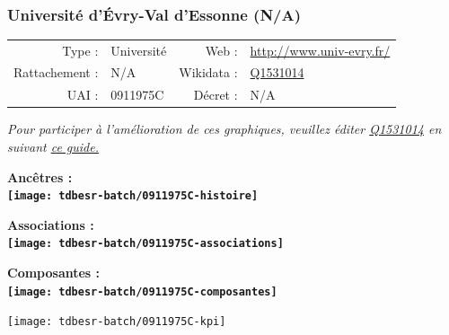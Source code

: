 \documentclass[12pt,french,]{article}
\begin{document}
\ifoddpage ~\newpage \fi   

\hypertarget{universituxe9-duxe9vry-val-dessonne-na}{%
\subsubsection{Université d'Évry-Val d'Essonne
(N/A)}\label{universituxe9-duxe9vry-val-dessonne-na}}

\begin{tabular*}{\textwidth}{rp{5cm}rl}  
\hline  
Type : & Université & Web : &\href{http://www.univ-evry.fr/}{http://www.univ-evry.fr/} \\  
Rattachement : & N/A & Wikidata : & \href{https://www.wikidata.org/entity/Q1531014}{Q1531014} \\  
UAI : & 0911975C & Décret : & N/A \\  
\hline  
\end{tabular*}

\textit{\scriptsize Pour participer à l'amélioration de ces graphiques, veuillez éditer  \href{https://www.wikidata.org/entity/Q1531014}{Q1531014}  en suivant \href{https://github.com/cpesr/wikidataESR/blob/master/Rmd/wikidataESR.md}{ce guide.}}

\vspace{1cm}  
\begin{minipage}[b]{0.50\textwidth}\begin{center} \bf Ancêtres : \\  
\texttt{[image: tdbesr-batch/0911975C-histoire]} \end{center}\end{minipage}\begin{minipage}[b]{0.50\textwidth}\begin{center} \bf Associations : \\  
\texttt{[image: tdbesr-batch/0911975C-associations]} \end{center}\end{minipage}

\hrulefill

\begin{center} \bf Composantes : \\  
\texttt{[image: tdbesr-batch/0911975C-composantes]} \end{center}

\begin{center}\texttt{[image: tdbesr-batch/0911975C-kpi]} \end{center}\checkoddpage

\ifoddpage ~\newpage \fi   
\end{document}
